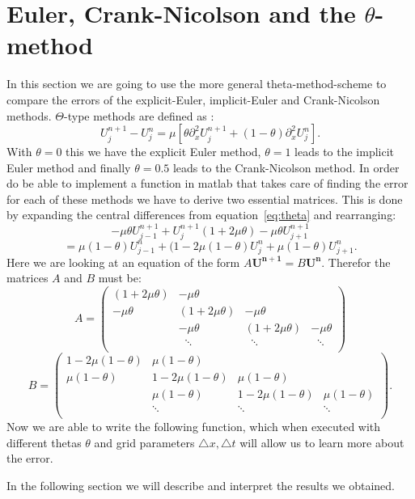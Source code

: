 \documentclass[ twoside,openright,titlepage,numbers=noenddot,headinclude,%
                footinclude=true,cleardoublepage=empty,abstractoff, %
                BCOR=5mm,paper=a4,fontsize=11pt,%
                ngerman,american,%
                ]{scrreprt}
\begin{document}
\section{Euler, Crank-Nicolson and the $\theta$-method}
In this section we are going to use the more general theta-method-scheme to compare the errors of the explicit-Euler, implicit-Euler and Crank-Nicolson methods. $\Theta$-type methods are defined as :
\begin{equation}
U_j^{n+1} - U_j^n = \mu [\theta \partial_x^2 U_j^{n+1} + (1-\theta) \partial_x^2 U_j^n].
\label{eq:theta}
\end{equation}
With $\theta = 0$ this we have the explicit Euler method, $\theta = 1$ leads to the implicit Euler method and finally $\theta = 0.5$ leads to the Crank-Nicolson method. In order do be able to implement a function in matlab that takes care of finding the error for each of these methods we have to derive two essential matrices. This is done by expanding the central differences from equation~\ref{eq:theta} and rearranging:
\begin{equation*}
-\mu \theta U_{j-1}^{n+1} + U_j^{n+1} ( 1 + 2\mu \theta) - \mu \theta U_{j+1}^{n+1}
\end{equation*}
\begin{equation}
= \mu (1 - \theta) U_{j-1}^n + (1 - 2\mu(1-\theta) U_j^n + \mu (1 - \theta) U_{j+1}^n.
\end{equation}
Here we are looking at an equation of the form $A \mathbf{U^{n+1}} = B \mathbf{U^{n}}$. Therefor the matrices $A$ and $B$ must be:
\begin{equation*}
A = \begin{pmatrix} 
(1 + 2\mu\theta) & -\mu\theta 	&		&		\\
-\mu\theta    & (1 + 2\mu\theta)& -\mu\theta	&		\\
	      &	 -\mu\theta	& (1+2\mu\theta)& -\mu\theta	\\
	      & \;\;\ddots	& \;\;\ddots	& \;\;\ddots	\\
		
\end{pmatrix}
\end{equation*}
\begin{equation}
B = \begin{pmatrix} 
1 - 2\mu(1-\theta) & \mu(1-\theta) 	&		&		\\
\mu(1-\theta)  	   & 1 - 2\mu(1-\theta)& \mu(1-\theta)&		\\
	      	    &	 \mu(1-\theta)	& 1 - 2\mu(1-\theta)& \mu(1-\theta)\\
	      	    & \ddots		& \ddots	& \ddots	\\
		
\end{pmatrix}.
\end{equation}
Now we are able to write the following function, which when executed with different thetas $\theta$ and grid parameters $\triangle x, \triangle t$ will allow us to learn more about the error. 

In the following section we will describe and interpret the results we obtained.
\end{document}
